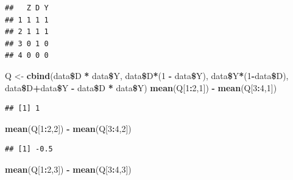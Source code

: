 \documentclass[]{article}
\newenvironment{Shaded}{\begin{snugshade}}{\end{snugshade}}
\newcommand{\KeywordTok}[1]{\textcolor[rgb]{0.13,0.29,0.53}{\textbf{#1}}}
\newcommand{\DecValTok}[1]{\textcolor[rgb]{0.00,0.00,0.81}{#1}}
\newcommand{\StringTok}[1]{\textcolor[rgb]{0.31,0.60,0.02}{#1}}
\newcommand{\OperatorTok}[1]{\textcolor[rgb]{0.81,0.36,0.00}{\textbf{#1}}}
\newcommand{\NormalTok}[1]{#1}
\begin{document}
\begin{verbatim}
##   Z D Y
## 1 1 1 1
## 2 1 1 1
## 3 0 1 0
## 4 0 0 0
\end{verbatim}

\begin{Shaded}
\begin{Highlighting}[]
\NormalTok{Q <-}\StringTok{ }\KeywordTok{cbind}\NormalTok{(data}\OperatorTok{\$}\NormalTok{D }\OperatorTok{*}\StringTok{ }\NormalTok{data}\OperatorTok{\$}\NormalTok{Y, data}\OperatorTok{\$}\NormalTok{D}\OperatorTok{*}\NormalTok{(}\DecValTok{1} \OperatorTok{-}\StringTok{ }\NormalTok{data}\OperatorTok{\$}\NormalTok{Y), data}\OperatorTok{\$}\NormalTok{Y}\OperatorTok{*}\NormalTok{(}\DecValTok{1}\OperatorTok{-}\NormalTok{data}\OperatorTok{\$}\NormalTok{D), data}\OperatorTok{\$}\NormalTok{D}\OperatorTok{+}\NormalTok{data}\OperatorTok{\$}\NormalTok{Y }\OperatorTok{-}\StringTok{ }\NormalTok{data}\OperatorTok{\$}\NormalTok{D }\OperatorTok{*}\StringTok{ }\NormalTok{data}\OperatorTok{\$}\NormalTok{Y)}
\KeywordTok{mean}\NormalTok{(Q[}\DecValTok{1}\OperatorTok{:}\DecValTok{2}\NormalTok{,}\DecValTok{1}\NormalTok{]) }\OperatorTok{-}\StringTok{ }\KeywordTok{mean}\NormalTok{(Q[}\DecValTok{3}\OperatorTok{:}\DecValTok{4}\NormalTok{,}\DecValTok{1}\NormalTok{])}
\end{Highlighting}
\end{Shaded}

\begin{verbatim}
## [1] 1
\end{verbatim}

\begin{Shaded}
\begin{Highlighting}[]
\KeywordTok{mean}\NormalTok{(Q[}\DecValTok{1}\OperatorTok{:}\DecValTok{2}\NormalTok{,}\DecValTok{2}\NormalTok{]) }\OperatorTok{-}\StringTok{ }\KeywordTok{mean}\NormalTok{(Q[}\DecValTok{3}\OperatorTok{:}\DecValTok{4}\NormalTok{,}\DecValTok{2}\NormalTok{])}
\end{Highlighting}
\end{Shaded}

\begin{verbatim}
## [1] -0.5
\end{verbatim}

\begin{Shaded}
\begin{Highlighting}[]
\KeywordTok{mean}\NormalTok{(Q[}\DecValTok{1}\OperatorTok{:}\DecValTok{2}\NormalTok{,}\DecValTok{3}\NormalTok{]) }\OperatorTok{-}\StringTok{ }\KeywordTok{mean}\NormalTok{(Q[}\DecValTok{3}\OperatorTok{:}\DecValTok{4}\NormalTok{,}\DecValTok{3}\NormalTok{])}
\end{Highlighting}
\end{Shaded}
\end{document}
